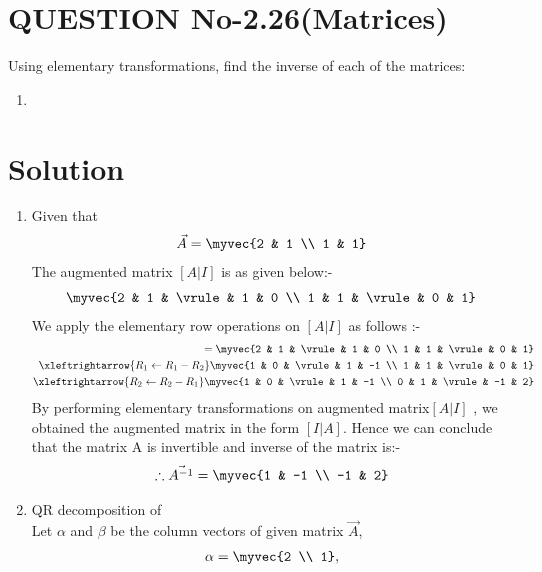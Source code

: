 \documentclass[journal,12pt,twocolumn]{IEEEtran}
\begin{document}
\section{QUESTION No-2.26(Matrices)}
Using elementary transformations, find the inverse of each of the matrices:
\begin{enumerate}
\item {}
\end{enumerate}
\section{Solution}
\begin{enumerate}
\item Given that
\begin{align}
\vec{A} = \myvec{2 & 1 \\ 1 & 1}
\end{align}
The augmented matrix $ [A | I]$ is as given below:- 
\begin{align}
\myvec{2 & 1 & \vrule & 1 & 0 \\ 1 & 1 & \vrule & 0 & 1}
\end{align}
We apply the elementary row operations on $ [A | I]$ as follows :-
\begin{align}
[A | I] = \myvec{2 & 1 & \vrule & 1 & 0 \\ 1 & 1 & \vrule & 0 & 1}
\\
\xleftrightarrow{R_1\leftarrow R_1-R_2}   
\myvec{1 & 0 & \vrule & 1 & -1 \\ 1 & 1 & \vrule & 0 & 1}
\\
\xleftrightarrow{R_2\leftarrow R_2-R_1}
\myvec{1 & 0 & \vrule & 1 & -1 \\ 0 & 1 & \vrule & -1 & 2}
\end{align}
By performing elementary transformations on augmented matrix$ [A | I]$ , we obtained the augmented matrix in the form $ [I | A]$. 
Hence we can conclude that the matrix A is invertible and inverse of the matrix is:-
\begin{align}
\therefore\vec{A^{-1}}=\myvec {1 & -1 \\  -1 & 2} 
\end{align}
\item QR decomposition of  
\\
Let $\alpha$ and $\beta$ be the column vectors of given matrix $\vec{A}$,
\begin{align}
\alpha=\myvec{2 \\ 1},

\end{align}
\end{enumerate}
\end{document}
